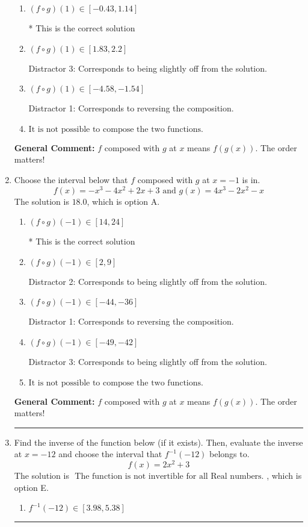 \documentclass{extbook}[14pt]
\newcommand{\litem}[1]{\item #1

\rule{\textwidth}{0.4pt}}
\begin{document}
\begin{enumerate}
{\begin{enumerate}[label=\Alph*.]
 Distractor 2: Corresponds to being slightly off from the solution.
\item \( (f \circ g)(1) \in [-0.43, 1.14] \)

* This is the correct solution
\item \( (f \circ g)(1) \in [1.83, 2.2] \)

 Distractor 3: Corresponds to being slightly off from the solution.
\item \( (f \circ g)(1) \in [-4.58, -1.54] \)

 Distractor 1: Corresponds to reversing the composition.
\item \( \text{It is not possible to compose the two functions.} \)


\end{enumerate}

\textbf{General Comment:} $f$ composed with $g$ at $x$ means $f(g(x))$. The order matters!
}
\litem{
Choose the interval below that $f$ composed with $g$ at $x=-1$ is in.
\[ f(x) = -x^{3} -4 x^{2} +2 x + 3 \text{ and } g(x) = 4x^{3} -2 x^{2} -x \]The solution is \( 18.0 \), which is option A.\begin{enumerate}[label=\Alph*.]
\item \( (f \circ g)(-1) \in [14, 24] \)

* This is the correct solution
\item \( (f \circ g)(-1) \in [2, 9] \)

 Distractor 2: Corresponds to being slightly off from the solution.
\item \( (f \circ g)(-1) \in [-44, -36] \)

 Distractor 1: Corresponds to reversing the composition.
\item \( (f \circ g)(-1) \in [-49, -42] \)

 Distractor 3: Corresponds to being slightly off from the solution.
\item \( \text{It is not possible to compose the two functions.} \)


\end{enumerate}

\textbf{General Comment:} $f$ composed with $g$ at $x$ means $f(g(x))$. The order matters!
}
\litem{
Find the inverse of the function below (if it exists). Then, evaluate the inverse at $x = -12$ and choose the interval that $f^{-1}(-12)$ belongs to.
\[ f(x) = 2 x^2 + 3 \]The solution is \( \text{ The function is not invertible for all Real numbers. } \), which is option E.\begin{enumerate}[label=\Alph*.]
\item \( f^{-1}(-12) \in [3.98, 5.38] \)


\end{enumerate}}
\end{enumerate}
\end{document}
